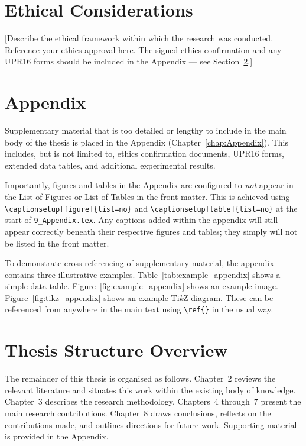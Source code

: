 \section{Ethical Considerations}
\label{sec:ethics}

[Describe the ethical framework within which the research was conducted. Reference your ethics approval here. The signed ethics confirmation and any UPR16 forms should be included in the Appendix --- see Section~\ref{sec:appendix}.]


\section{Appendix}
\label{sec:appendix}

Supplementary material that is too detailed or lengthy to include in the main body of the thesis is placed in the Appendix (Chapter~\ref{chap:Appendix}). This includes, but is not limited to, ethics confirmation documents, UPR16 forms, extended data tables, and additional experimental results.

Importantly, figures and tables in the Appendix are configured to \emph{not} appear in the List of Figures or List of Tables in the front matter. This is achieved using \verb|\captionsetup[figure]{list=no}| and \verb|\captionsetup[table]{list=no}| at the start of \texttt{9\_Appendix.tex}. Any captions added within the appendix will still appear correctly beneath their respective figures and tables; they simply will not be listed in the front matter.

To demonstrate cross-referencing of supplementary material, the appendix contains three illustrative examples. Table~\ref{tab:example_appendix} shows a simple data table. Figure~\ref{fig:example_appendix} shows an example image. Figure~\ref{fig:tikz_appendix} shows an example Ti\textit{k}Z diagram. These can be referenced from anywhere in the main text using \verb|\ref{}| in the usual way.


\section{Thesis Structure Overview}
\label{chap:ThesisStructure}

The remainder of this thesis is organised as follows. Chapter~2 reviews the relevant literature and situates this work within the existing body of knowledge. Chapter~3 describes the research methodology. Chapters~4 through~7 present the main research contributions. Chapter~8 draws conclusions, reflects on the contributions made, and outlines directions for future work. Supporting material is provided in the Appendix.

\let\cleardoublepage\clearpage
